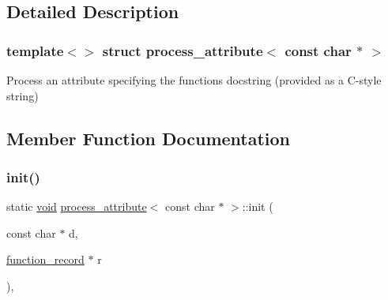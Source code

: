 \subsection{Detailed Description}
\subsubsection*{template$<$$>$\newline
struct process\+\_\+attribute$<$ const char $\ast$ $>$}

Process an attribute specifying the function\textquotesingle{}s docstring (provided as a C-\/style string) 

\subsection{Member Function Documentation}
\mbox{\label{structprocess__attribute_3_01const_01char_01_5_01_4_aa3fbc8ac0ed21420fb92774ff884cd8c}} 
\subsubsection{\texorpdfstring{init()}{init()}\hspace{0.1cm}{\footnotesize\ttfamily [1/2]}}
{\footnotesize\ttfamily static \mbox{\hyperlink{_s_d_l__opengles2__gl2ext_8h_ae5d8fa23ad07c48bb609509eae494c95}{void}} \mbox{\hyperlink{structprocess__attribute}{process\+\_\+attribute}}$<$ const char $\ast$ $>$\+::init (\begin{DoxyParamCaption}\item[{const char $\ast$}]{d,  }\item[{\mbox{\hyperlink{structfunction__record}{function\+\_\+record}} $\ast$}]{r }\end{DoxyParamCaption})\hspace{0.3cm}{\ttfamily [inline]}, {\ttfamily [static]}}

\mbox{\label{structprocess__attribute_3_01const_01char_01_5_01_4_a6c0c61df22dfb8a89cf803ea8b51cbb4}} 
